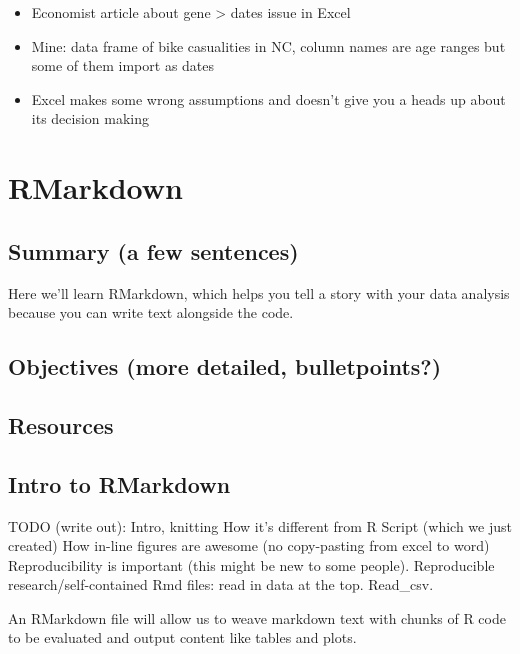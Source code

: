 \documentclass[]{book}
\providecommand{\tightlist}{%
  \setlength{\itemsep}{0pt}\setlength{\parskip}{0pt}}
\begin{document}
\begin{itemize}
\tightlist
\item
  Economist article about gene \textgreater{} dates issue in Excel
\item
  Mine: data frame of bike casualities in NC, column names are age ranges but some of them import as dates
\item
  Excel makes some wrong assumptions and doesn't give you a heads up about its decision making
\end{itemize}

\hypertarget{rmarkdown}{%
\chapter{RMarkdown}\label{rmarkdown}}

\hypertarget{summary-a-few-sentences-1}{%
\section{Summary (a few sentences)}\label{summary-a-few-sentences-1}}

Here we'll learn RMarkdown, which helps you tell a story with your data analysis because you can write text alongside the code.

\hypertarget{objectives-more-detailed-bulletpoints-1}{%
\section{Objectives (more detailed, bulletpoints?)}\label{objectives-more-detailed-bulletpoints-1}}

\hypertarget{resources-2}{%
\section{Resources}\label{resources-2}}

\hypertarget{intro-to-rmarkdown}{%
\section{Intro to RMarkdown}\label{intro-to-rmarkdown}}

TODO (write out):
Intro, knitting
How it's different from R Script (which we just created)
How in-line figures are awesome (no copy-pasting from excel to word)
Reproducibility is important (this might be new to some people). Reproducible research/self-contained Rmd files: read in data at the top. Read\_csv.

An RMarkdown file will allow us to weave markdown text with chunks of R code to be evaluated and output content like tables and plots.
\end{document}
